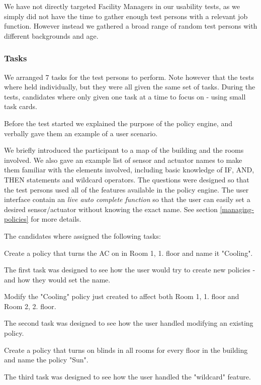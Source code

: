 We have not directly targeted Facility Managers in our usability tests, as we simply did not have the time to gather enough test persons with a relevant job function. However instead we gathered a broad range of random test persons with different backgrounds and age.

\subsubsection{Tasks}
We arranged 7 tasks for the test persons to perform. Note however that the tests where held individually, but they were all given the same set of tasks. 
During the tests, candidates where only given one task at a time to focus on - using small task cards.

Before the test started we explained the purpose of the policy engine, and verbally gave them an example of a user scenario.

We briefly introduced the participant to a map of the building and the rooms involved. We also gave an example list of sensor and actuator names to make them familiar with the elements involved, including basic knowledge of IF, AND, THEN statements and wildcard operators. The questions were designed so that the test persons used all of the features available in the policy engine. The user interface contain an \textit{live auto complete function} so that the user can easily set a desired sensor/actuator without knowing the exact name. See section \ref{managing-policies} for more details.

The candidates where assigned the following tasks:

\begin{framed}
Create a policy that turns the AC on in Room 1, 1. floor and name it "Cooling".
\end{framed}
The first task was designed to see how the user would try to create new policies - and how they would set the name.

\begin{framed}
Modify the "Cooling" policy just created to affect both Room 1, 1. floor and Room 2, 2. floor.
\end{framed}
The second task was designed to see how the user handled modifying an existing policy.

\begin{framed}
Create a policy that turns on blinds in all rooms for every floor in the building and name the policy "Sun".
\end{framed}
The third task was designed to see how the user handled the "wildcard" feature.

